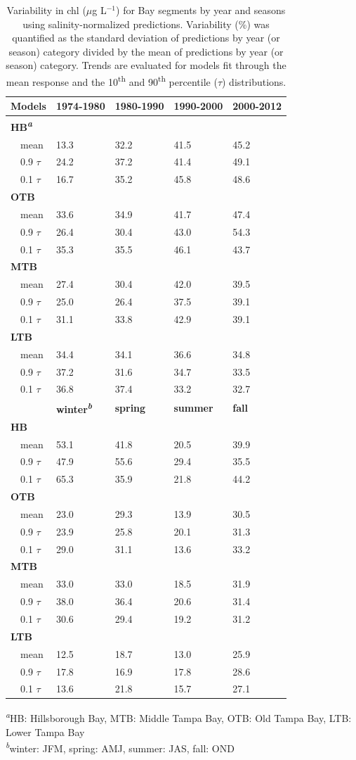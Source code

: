 \documentclass{svjour3}\usepackage[]{graphicx}\usepackage[]{color}
\newcommand{\mugl}{$\mu$g L$^{-1}$}
\begin{document}
\begin{table}[!tbp]
\caption{Variability in \ac{chl} (\mugl) for Bay segments by year and seasons using salinity-normalized predictions.  Variability (\%) was quantified as the standard deviation of predictions by year (or season) category divided by the mean of predictions by year (or season) category.  Trends are evaluated for models fit through the mean response and the 10\textsuperscript{th} and 90\textsuperscript{th} percentile ($\tau$) distributions.\label{tab:nrmcv}} 
\begin{center}
\begin{tabular}{lllll}
\hline\hline
\multicolumn{1}{l}{{\bf Models}}&\multicolumn{1}{c}{{\bf 1974-1980}}&\multicolumn{1}{c}{{\bf 1980-1990}}&\multicolumn{1}{c}{{\bf 1990-2000}}&\multicolumn{1}{c}{{\bf 2000-2012}}\tabularnewline
\hline
{\bfseries HB\textsuperscript{\textit{a}}}&&&&\tabularnewline
~~mean&13.3&32.2&41.5&45.2\tabularnewline
~~0.9 $\tau$&24.2&37.2&41.4&49.1\tabularnewline
~~0.1 $\tau$&16.7&35.2&45.8&48.6\tabularnewline
\hline
{\bfseries OTB}&&&&\tabularnewline
~~mean&33.6&34.9&41.7&47.4\tabularnewline
~~0.9 $\tau$&26.4&30.4&43.0&54.3\tabularnewline
~~0.1 $\tau$&35.3&35.5&46.1&43.7\tabularnewline
\hline
{\bfseries MTB}&&&&\tabularnewline
~~mean&27.4&30.4&42.0&39.5\tabularnewline
~~0.9 $\tau$&25.0&26.4&37.5&39.1\tabularnewline
~~0.1 $\tau$&31.1&33.8&42.9&39.1\tabularnewline
\hline
{\bfseries LTB}&&&&\tabularnewline
~~mean&34.4&34.1&36.6&34.8\tabularnewline
~~0.9 $\tau$&37.2&31.6&34.7&33.5\tabularnewline
~~0.1 $\tau$&36.8&37.4&33.2&32.7\tabularnewline
\hline
~~&{\bf winter\textsuperscript{\textit{b}}}&{\bf spring}&{\bf summer}&{\bf fall}\tabularnewline
\hline
{\bfseries HB}&&&&\tabularnewline
~~mean&53.1&41.8&20.5&39.9\tabularnewline
~~0.9 $\tau$&47.9&55.6&29.4&35.5\tabularnewline
~~0.1 $\tau$&65.3&35.9&21.8&44.2\tabularnewline
\hline
{\bfseries OTB}&&&&\tabularnewline
~~mean&23.0&29.3&13.9&30.5\tabularnewline
~~0.9 $\tau$&23.9&25.8&20.1&31.3\tabularnewline
~~0.1 $\tau$&29.0&31.1&13.6&33.2\tabularnewline
\hline
{\bfseries MTB}&&&&\tabularnewline
~~mean&33.0&33.0&18.5&31.9\tabularnewline
~~0.9 $\tau$&38.0&36.4&20.6&31.4\tabularnewline
~~0.1 $\tau$&30.6&29.4&19.2&31.2\tabularnewline
\hline
{\bfseries LTB}&&&&\tabularnewline
~~mean&12.5&18.7&13.0&25.9\tabularnewline
~~0.9 $\tau$&17.8&16.9&17.8&28.6\tabularnewline
~~0.1 $\tau$&13.6&21.8&15.7&27.1\tabularnewline
\hline
\end{tabular}\end{center}

\footnotesize \textsuperscript{\textit{a}}HB: Hillsborough Bay, MTB: Middle Tampa Bay, OTB: Old Tampa Bay, LTB: Lower Tampa Bay\\\textsuperscript{\textit{b}}winter: JFM, spring: AMJ, summer: JAS, fall: OND\end{table}
\end{document}
